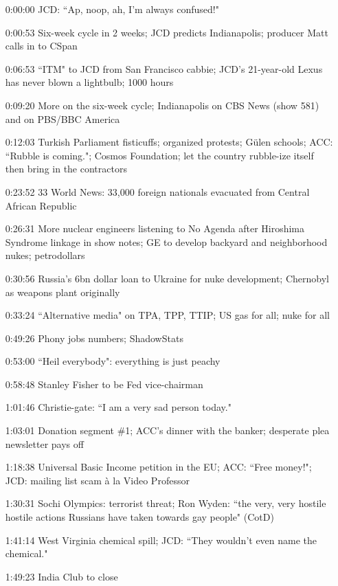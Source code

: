 \documentclass{report}
\newcommand{\mono}[1]{{\fontspec{Courier}#1}}
\begin{document}
\begin{itemize}
\item[\mono{0:00:00}] JCD: ``Ap, noop, ah, I'm always confused!"
\item[\mono{0:00:53}] Six-week cycle in 2 weeks; JCD predicts Indianapolis; producer Matt calls in to CSpan
\item[\mono{0:06:53}] ``ITM" to JCD from San Francisco cabbie; JCD's 21-year-old Lexus has never blown a lightbulb; 1000 hours
\item[\mono{0:09:20}] More on the six-week cycle; Indianapolis on CBS News (show 581) and on PBS/BBC America
\item[\mono{0:12:03}] Turkish Parliament fisticuffs; organized protests; Gülen schools; ACC: ``Rubble is coming."; Cosmos Foundation; let the country rubble-ize itself then bring in the contractors
\item[\mono{0:23:52}] 33 World News: 33,000 foreign nationals evacuated from Central African Republic
\item[\mono{0:26:31}] More nuclear engineers listening to No Agenda after Hiroshima Syndrome linkage in show notes; GE to develop backyard and neighborhood nukes; petrodollars
\item[\mono{0:30:56}] Russia's 6bn dollar loan to Ukraine for nuke development; Chernobyl as weapons plant originally
\item[\mono{0:33:24}] ``Alternative media" on TPA, TPP, TTIP; US gas for all; nuke for all
\item[\mono{0:49:26}] Phony jobs numbers; ShadowStats
\item[\mono{0:53:00}] ``Heil everybody": everything is just peachy
\item[\mono{0:58:48}] Stanley Fisher to be Fed vice-chairman
\item[\mono{1:01:46}] Christie-gate: ``I am a very sad person today."
\item[\mono{1:03:01}] Donation segment \#1; ACC's dinner with the banker; desperate plea newsletter pays off
\item[\mono{1:18:38}] Universal Basic Income petition in the EU; ACC: ``Free money!"; JCD: mailing list scam à la Video Professor
\item[\mono{1:30:31}] Sochi Olympics: terrorist threat; Ron Wyden: ``the very, very hostile hostile actions Russians have taken towards gay people" (CotD)
\item[\mono{1:41:14}] West Virginia chemical spill; JCD: ``They wouldn't even name the chemical."
\item[\mono{1:49:23}] India Club to close

\end{itemize}
\end{document}

